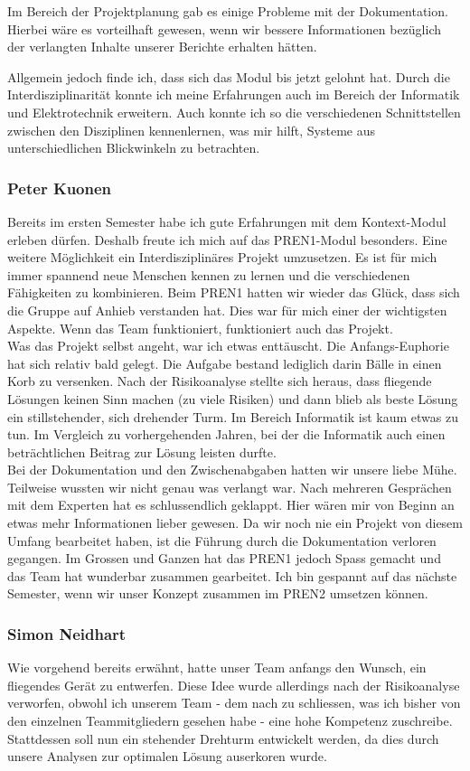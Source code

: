 Im Bereich der Projektplanung gab es einige Probleme mit der Dokumentation. Hierbei wäre es vorteilhaft gewesen, wenn wir bessere Informationen bezüglich der verlangten Inhalte unserer Berichte erhalten hätten.

Allgemein jedoch finde ich, dass sich das Modul bis jetzt gelohnt hat. Durch die Interdisziplinarität konnte ich meine Erfahrungen auch im Bereich der Informatik und Elektrotechnik erweitern. Auch konnte ich so die verschiedenen Schnittstellen zwischen den Disziplinen kennenlernen, was mir hilft, Systeme aus unterschiedlichen Blickwinkeln zu betrachten.

\subsubsection*{Peter Kuonen}
Bereits im ersten Semester habe ich gute Erfahrungen mit dem Kontext-Modul erleben dürfen. Deshalb freute ich mich auf das PREN1-Modul besonders. Eine weitere Möglichkeit ein Interdisziplinäres Projekt umzusetzen. Es ist für mich immer spannend neue Menschen kennen zu lernen und die verschiedenen Fähigkeiten zu kombinieren. Beim PREN1 hatten wir wieder das Glück, dass sich die Gruppe auf Anhieb verstanden hat. Dies war für mich einer der wichtigsten Aspekte. Wenn das Team funktioniert, funktioniert auch das Projekt.\\
%
Was das Projekt selbst angeht, war ich etwas enttäuscht. Die Anfangs-Euphorie hat sich relativ bald gelegt. Die Aufgabe bestand lediglich darin Bälle in einen Korb zu versenken. Nach der Risikoanalyse stellte sich heraus, dass fliegende Lösungen keinen Sinn machen (zu viele Risiken) und dann blieb als beste Lösung ein stillstehender, sich drehender Turm. Im Bereich Informatik ist  kaum etwas zu tun. Im Vergleich zu vorhergehenden Jahren, bei der die Informatik auch einen beträchtlichen Beitrag zur Lösung leisten durfte.\\
%
Bei der Dokumentation und den Zwischenabgaben hatten wir unsere liebe Mühe. Teilweise wussten wir nicht genau was verlangt war. Nach mehreren Gesprächen mit dem Experten hat es  schlussendlich geklappt. Hier wären mir von Beginn an etwas mehr Informationen lieber gewesen. Da wir noch nie ein Projekt von diesem Umfang bearbeitet haben, ist die Führung durch die Dokumentation verloren gegangen. 
Im Grossen und Ganzen hat das PREN1 jedoch Spass gemacht und das Team hat wunderbar zusammen gearbeitet. Ich bin gespannt auf das nächste Semester, wenn wir unser Konzept zusammen im PREN2 umsetzen können.
\subsubsection*{Simon Neidhart}
Wie vorgehend bereits erwähnt, hatte unser Team anfangs den Wunsch, ein fliegendes Gerät zu entwerfen. Diese Idee wurde allerdings nach der Risikoanalyse verworfen, obwohl ich unserem Team - dem nach zu schliessen, was ich bisher von den einzelnen Teammitgliedern gesehen habe - eine hohe Kompetenz zuschreibe. Stattdessen soll nun ein stehender Drehturm entwickelt werden, da dies durch unsere Analysen zur optimalen Lösung auserkoren wurde.

